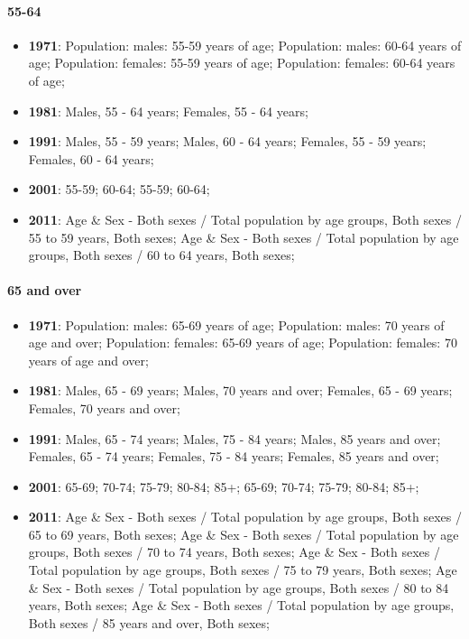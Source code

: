 \documentclass[a4paper]{article}
\begin{document}
\paragraph{55-64}
\begin{itemize}
   \item{\textbf{1971}:  Population: males: 55-59 years of age; Population: males: 60-64 years of age; Population: females: 55-59 years of age; Population: females: 60-64 years of age;}
   \item{\textbf{1981}:  Males, 55 - 64 years; Females, 55 - 64 years;}
   \item{\textbf{1991}:  Males, 55 - 59 years; Males, 60 - 64 years; Females, 55 - 59 years; Females, 60 - 64 years;}
   \item{\textbf{2001}:  55-59; 60-64; 55-59; 60-64;}
   \item{\textbf{2011}:  Age \& Sex - Both sexes / Total population by age groups, Both sexes / 55 to 59 years, Both sexes; Age \& Sex - Both sexes / Total population by age groups, Both sexes / 60 to 64 years, Both sexes;}
\end{itemize}

\paragraph{65 and over}
\begin{itemize}
   \item{\textbf{1971}:  Population: males: 65-69 years of age; Population: males: 70 years of age and over; Population: females: 65-69 years of age; Population: females: 70 years of age and over;}
   \item{\textbf{1981}:  Males, 65 - 69 years; Males, 70 years and over; Females, 65 - 69 years; Females, 70 years and over;}
   \item{\textbf{1991}:  Males, 65 - 74 years; Males, 75 - 84 years; Males, 85 years and over; Females, 65 - 74 years; Females, 75 - 84 years; Females, 85 years and over;}
   \item{\textbf{2001}:  65-69; 70-74; 75-79; 80-84; 85+; 65-69; 70-74; 75-79; 80-84; 85+;}
   \item{\textbf{2011}:  Age \& Sex - Both sexes / Total population by age groups, Both sexes / 65 to 69 years, Both sexes; Age \& Sex - Both sexes / Total population by age groups, Both sexes / 70 to 74 years, Both sexes; Age \& Sex - Both sexes / Total population by age groups, Both sexes / 75 to 79 years, Both sexes; Age \& Sex - Both sexes / Total population by age groups, Both sexes / 80 to 84 years, Both sexes; Age \& Sex - Both sexes / Total population by age groups, Both sexes / 85 years and over, Both sexes;}
\end{itemize}
\end{document}
